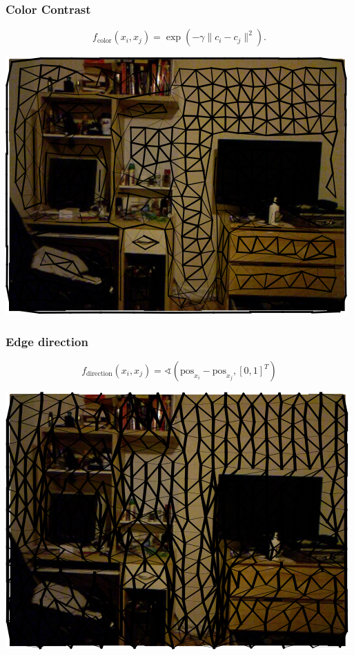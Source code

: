 \documentclass[final,ignorenonframetext,compress]{beamer}
\begin{document}
    \begin{frame}
        \frametitle{Color Contrast}
        \[
        f_\text{color}(x_i, x_j) = \exp\left(-\gamma \lVert c_i - c_j \rVert^2\right).
         \]
            \begin{center}
                \includegraphics[width=.6\linewidth]{images/00062_pipline_feature_pairwise_1}
            \end{center}

    \end{frame}

    \begin{frame}
        \frametitle{Edge direction}
        \[
            f_\text{direction}(x_i, x_j) = \sphericalangle(\text{pos}_{x_i} - \text{pos}_{x_j}, [0, 1]^T)
         \]
        \begin{center}
            \includegraphics[width=.6\linewidth]{images/00062_pipline_feature_pairwise_4}
        \end{center}
    \end{frame}
\end{document}
